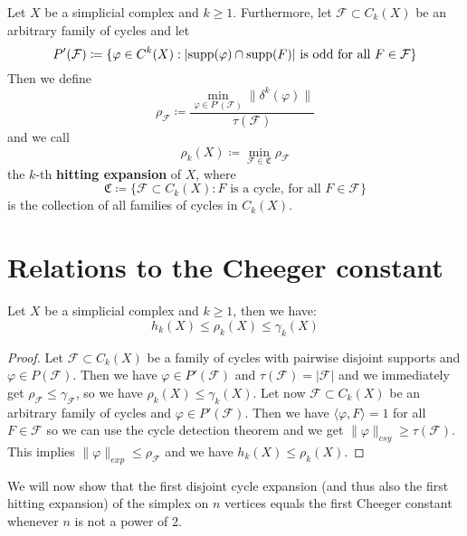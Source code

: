 \begin{defi}\label{definition412}
Let \(X\) be a simplicial complex and \(k\geq 1\). Furthermore, let \(\mathcal{F}\subset C_k(X)\) be an arbitrary family of cycles and let
\[
P'(\mathcal{F})\coloneqq\{\varphi\in C^k(X):|\mathrm{supp}(\varphi)\cap\mathrm{supp}(F)|\text{ is odd for all }F\in\mathcal{F}\}
\]
Then we define
\[
\rho_{\mathcal{F}}\coloneqq\frac{\min\limits_{\varphi\in P'(\mathcal{F})}\|\delta^k(\varphi)\|}{\tau(\mathcal{F})}
\]
and we call
\[
\rho_k(X)\coloneqq\min\limits_{\mathcal{F}\in\mathfrak{C}}\rho_{\mathcal{F}}
\]
the \(k\)-th \textbf{hitting expansion} of \(X\), where
\[
\mathfrak{C}\coloneqq\{\mathcal{F}\subset C_k(X):F\text{ is a cycle, for all }F\in\mathcal{F}\}
\]
is the collection of all families of cycles in \(C_k(X)\).
\end{defi}

\section{Relations to the Cheeger constant}

\begin{prop}\label{proposition411}
Let \(X\) be a simplicial complex and \(k\geq 1\), then we have:
\[
h_k(X)\leq\rho_k(X)\leq\gamma_k(X)
\]
\begin{proof}
Let \(\mathcal{F}\subset C_k(X)\) be a family of cycles with pairwise disjoint supports and \(\varphi\in P(\mathcal{F})\). Then we have \(\varphi\in P'(\mathcal{F})\) and \(\tau(\mathcal{F})=|\mathcal{F}|\) and we immediately get \(\rho_{\mathcal{F}}\leq\gamma_{\mathcal{F}}\), so we have \(\rho_k(X)\leq\gamma_k(X)\). Let now \(\mathcal{F}\subset C_k(X)\) be an arbitrary family of cycles and \(\varphi\in P'(\mathcal{F})\). Then we have \(\langle\varphi,F\rangle=1\) for all \(F\in\mathcal{F}\) so we can use the cycle detection theorem and we get \(\|\varphi\|_{csy}\geq\tau(\mathcal{F})\). This implies \(\|\varphi\|_{exp}\leq\rho_{\mathcal{F}}\) and we have \(h_k(X)\leq\rho_k(X)\).
\end{proof}
\end{prop}

We will now show that the first disjoint cycle expansion (and thus also the first hitting expansion) of the simplex on \(n\) vertices equals the first Cheeger constant whenever \(n\) is not a power of \(2\).

